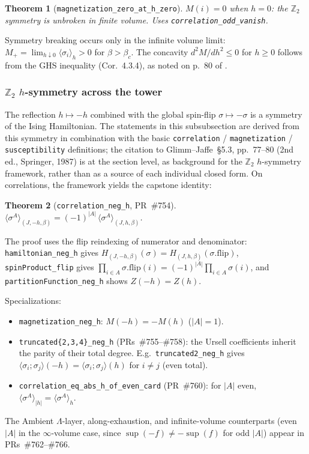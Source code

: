 \documentclass[a4paper,11pt]{article}
\newtheorem{theorem}{Theorem}
\begin{document}
\begin{theorem}[\texttt{magnetization\_zero\_at\_h\_zero}]
$M(i) = 0$ when $h = 0$: the $\mathbb{Z}_2$ symmetry is unbroken in finite
volume. Uses \texttt{correlation\_odd\_vanish}.
\end{theorem}

Symmetry breaking occurs only in the infinite volume limit:
$M_+ = \lim_{h \downarrow 0} \langle\sigma_i\rangle_h > 0$ for $\beta > \beta_c$.
The concavity $d^2 M/dh^2 \le 0$ for $h \ge 0$ follows from the GHS inequality
(Cor.~4.3.4), as noted on p.~80 of \cite{glimm-jaffe}.

\subsubsection{\texorpdfstring{$\mathbb{Z}_2$ $h$-symmetry across the tower}{Z2 h-symmetry across the tower}}

The reflection $h \mapsto -h$ combined with the global spin-flip
$\sigma \mapsto -\sigma$ is a symmetry of the Ising Hamiltonian. The
statements in this subsubsection are derived from this symmetry in
combination with the basic \texttt{correlation} / \texttt{magnetization}
/ \texttt{susceptibility} definitions; the citation to
Glimm--Jaffe~\S5.3, pp.~77--80 (2nd ed., Springer, 1987) is at the
section level, as background for the $\mathbb{Z}_2$ $h$-symmetry
framework, rather than as a source of each individual closed form.
On correlations, the framework yields the capstone identity:
\begin{theorem}[\texttt{correlation\_neg\_h}, PR~\#754]
$\langle \sigma^A \rangle_{(J,-h,\beta)}
 = (-1)^{|A|}\,\langle \sigma^A \rangle_{(J,h,\beta)}$.
\end{theorem}
\noindent The proof uses the flip reindexing of numerator and denominator:
\texttt{hamiltonian\_neg\_h} gives $H_{(J,-h,\beta)}(\sigma)
= H_{(J,h,\beta)}(\sigma.\mathrm{flip})$, \texttt{spinProduct\_flip}
gives $\prod_{i\in A}\sigma.\mathrm{flip}(i) = (-1)^{|A|}\prod_{i\in A}\sigma(i)$,
and \texttt{partitionFunction\_neg\_h} shows $Z(-h) = Z(h)$.

Specializations:
\begin{itemize}
\item \texttt{magnetization\_neg\_h}: $M(-h) = -M(h)$ ($|A|=1$).
\item \texttt{truncated\{2,3,4\}\_neg\_h} (PRs~\#755--\#758): the Ursell
      coefficients inherit the parity of their total degree. E.g.\
      \texttt{truncated2\_neg\_h} gives $\langle\sigma_i;\sigma_j\rangle(-h)
      = \langle\sigma_i;\sigma_j\rangle(h)$ for $i\neq j$ (even total).
\item \texttt{correlation\_eq\_abs\_h\_of\_even\_card} (PR~\#760): for
      $|A|$ even, $\langle\sigma^A\rangle_{|h|} = \langle\sigma^A\rangle_{h}$.
\end{itemize}
The Ambient $\Lambda$-layer, along-exhaustion, and infinite-volume
counterparts (even $|A|$ in the $\infty$-volume case, since
$\sup(-f) \ne -\sup(f)$ for odd $|A|$) appear in PRs~\#762--\#766.
\end{document}

